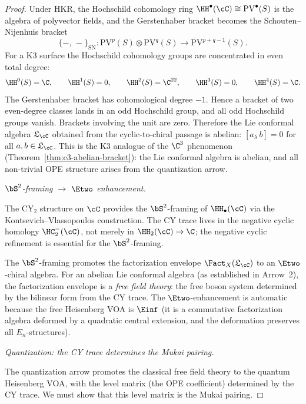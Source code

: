 \begin{proof}
\smallskip\noindent
Under HKR, the Hochschild cohomology ring $\HH^\bullet(\cC) \cong \mathrm{PV}^\bullet(S)$ is the algebra of polyvector fields, and the Gerstenhaber bracket becomes the Schouten--Nijenhuis bracket
\[
 \{-,\, -\}_{\mathrm{SN}} \colon \mathrm{PV}^p(S) \otimes \mathrm{PV}^q(S) \longrightarrow \mathrm{PV}^{p+q-1}(S).
\]
For a K3 surface the Hochschild cohomology groups are concentrated in
even total degree:
\[
\HH^0(S)=\C,\qquad
\HH^1(S)=0,\qquad
\HH^2(S)=\C^{22},\qquad
\HH^3(S)=0,\qquad
\HH^4(S)=\C.
\]
The Gerstenhaber bracket has cohomological degree \(-1\).  Hence a
bracket of two even-degree classes lands in an odd Hochschild group, and
all odd Hochschild groups vanish.  Brackets involving the unit are zero.
Therefore the Lie conformal algebra \(\mathfrak L_\cC\) obtained from
the cyclic-to-chiral passage is abelian:
$[a_\lambda\, b] = 0$ for all $a, b \in \mathfrak{L}_\cC$. This is the K3 analogue of the $\C^3$ phenomenon (Theorem~\ref{thm:c3-abelian-bracket}): the Lie conformal algebra is abelian, and all non-trivial OPE structure arises from the quantization arrow.

\medskip\noindent
\noindent\emph{$\bS^2$-framing $\to$ $\Etwo$ enhancement.}

\smallskip\noindent
The CY$_2$ structure on $\cC$ provides the $\bS^2$-framing of $\HH_\bullet(\cC)$ via the Kontsevich--Vlassopoulos construction. The CY trace lives in the negative cyclic homology $\HC^-_2(\cC)$, not merely in $\HH_2(\cC) \to \C$; the negative cyclic refinement is essential for the $\bS^2$-framing.

The $\bS^2$-framing promotes the factorization envelope $\Fact_X(\mathfrak{L}_\cC)$ to an $\Etwo$-chiral algebra. For an abelian Lie conformal algebra (as established in Arrow~2), the factorization envelope is a \emph{free field theory}: the free boson system determined by the bilinear form from the CY trace. The $\Etwo$-enhancement is automatic because the free Heisenberg VOA is $\Einf$ (it is a commutative factorization algebra deformed by a quadratic central extension, and the deformation preserves all $E_n$-structures).

\medskip\noindent
\noindent\emph{Quantization: the CY trace determines the Mukai pairing.}

\smallskip\noindent
The quantization arrow promotes the classical free field theory to the quantum Heisenberg VOA, with the level matrix (the OPE coefficient) determined by the CY trace. We must show that this level matrix is the Mukai pairing.


\end{proof}
